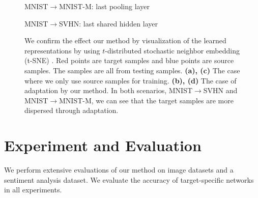 \documentclass{article}
\begin{document}
 \newcommand\subcaption[1]{\begin{center}#1\end{center}}
\begin{figure*}[t]
\begin{minipage}{0.5\hsize}
\subcaption{MNIST$\rightarrow$MNIST-M: last pooling layer}
\centering
   \begin{subfigure}[Non-adapted]{\centering
   \texttt{[image: embed\_mnist2m\_cut.eps]} \label{fig:mnist2m_noad}}
    \end{subfigure}
 \centering
\begin{subfigure}[Adapted]{\centering
   \texttt{[image: embed\_mnist2m2\_cut.eps]}  \label{fig:mnist2m_ad}}
    \end{subfigure}
    \end{minipage}
    \begin{minipage}{0.5\hsize}
\subcaption{MNIST$\rightarrow$SVHN: last shared hidden layer}
  \centering
   \begin{subfigure}[Non-adapted]{\centering
   \texttt{[image: svhn\_noad\_cut.eps]}\label{fig:mnist2svhn_noad}}
    \end{subfigure}
      \begin{subfigure}[Adapted]{\centering
   \texttt{[image: svhn\_embed\_ad25\_cut.eps]}\label{fig:mnist2svhn_ad}}
    \end{subfigure}
    \end{minipage}
  \caption{We confirm the effect our method by visualization of the learned representations by using $t$-distributed stochastic neighbor embedding (t-SNE) \cite{maaten2008visualizing}. Red points are target samples and blue points are source samples. The samples are all from testing samples. {\bf (a), (c)} The case where we only use source samples for training. {\bf (b), (d)} The case of adaptation by our method. In both scenarios, MNIST$\rightarrow$SVHN and MNIST$\rightarrow$MNIST-M, we can see that the target samples are more dispersed through adaptation.}
  \label{fig:embed_mnist}
\end{figure*}
\vspace{-2mm}
\section{Experiment and Evaluation}
We perform extensive evaluations of our method on image datasets and a sentiment analysis dataset. We evaluate the accuracy of target-specific networks in all experiments. 
\end{document}
